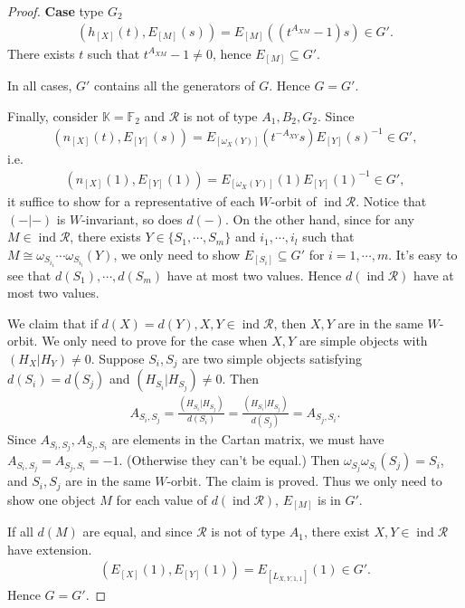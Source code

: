 \documentclass[12pt]{amsart}
\begin{document}
\begin{proof}
   \textbf{Case} type $G_2$
   \begin{align*}
    (h_{[X]}(t),E_{[M]}(s)) = E_{[M]}((t^{A_{XM}}-1)s) \in G'.
   \end{align*}
   There exists $t$ such that $t^{A_{XM}}-1 \neq 0$, hence $E_{[M]}\subseteq  G'$.

   In all cases, $G'$ contains all the generators of $G$. Hence $G=G'$.

   Finally, consider $\mathbb{K}=\mathbb{F}_2$ and $\mathcal{R}$ is not of type $A_1,B_2,G_2$.
   Since
   \begin{align*}
    (n_{[X]}(t),E_{[Y]}(s)) = E_{[\omega_X(Y)]}(t^{-A_{XY}}s) E_{[Y]}(s)^{-1} \in G',
   \end{align*}
   i.e.
   \begin{align*}
    (n_{[X]}(1),E_{[Y]}(1)) = E_{[\omega_X(Y)]}(1) E_{[Y]}(1)^{-1} \in G',
   \end{align*}
   it suffice to show for a representative of each $W$-orbit of $\operatorname{ind}\mathcal{R}$.
   Notice that $(-|-)$ is $W$-invariant, so does $d(-)$. 
   On the other hand, since for any $M\in \operatorname{ind}\mathcal{R}$, there exists $Y\in \{ S_{1},\cdots,S_{m} \}$ and $i_1,\cdots,i_l$ such that $M\cong \omega_{S_{i_1}}\cdots\omega_{S_{i_l}}(Y)$,
   we only need to show $E_{[S_i]}\subseteq  G'$ for $i=1,\cdots,m$.
   It's easy to see that $d(S_1),\cdots,d(S_m)$ have at most two values.
   Hence $d(\operatorname{ind}\mathcal{R})$ have at most two values.

   We claim that if $d(X) = d(Y), X,Y\in \operatorname{ind}\mathcal{R}$, then $X,Y$ are in the same $W$-orbit.
   We only need to prove for the case when $X,Y$ are simple objects with $(H_X|H_Y)\neq 0$.
   Suppose $S_i,S_j$ are two simple objects satisfying $d(S_i)=d(S_j)$ and $(H_{S_i}|H_{S_j}) \neq 0$.
   Then 
   \begin{align*}
    A_{S_i,S_j} = \frac{(H_{S_i}|H_{S_j})}{d(S_i)} =  \frac{(H_{S_i}|H_{S_j})}{d(S_j)} = A_{S_j,S_i}.
   \end{align*}
   Since $A_{S_i,S_j},A_{S_j,S_i}$ are elements in the Cartan matrix, we must have $A_{S_i,S_j} = A_{S_j,S_i}=-1$.
   (Otherwise they can't be equal.)
   Then $\omega_{S_j}\omega_{S_i}(S_j)=S_i$, and $S_i,S_j$ are in the same $W$-orbit.
   The claim is proved.
   Thus we only need to show one object $M$ for each value of $d(\operatorname{ind}\mathcal{R})$, $E_{[M]}$ is in $G'$.

   If all $d(M)$ are equal, and since $\mathcal{R}$ is not of type $A_1$, there exist $X,Y\in \operatorname{ind}\mathcal{R}$ have extension.
   \begin{align*}
    (E_{[X]}(1),E_{[Y]}(1)) = E_{[L_{X,Y,1,1}]}(1) \in G'.
   \end{align*}
   Hence $G=G'$.


\end{proof}
\end{document}
